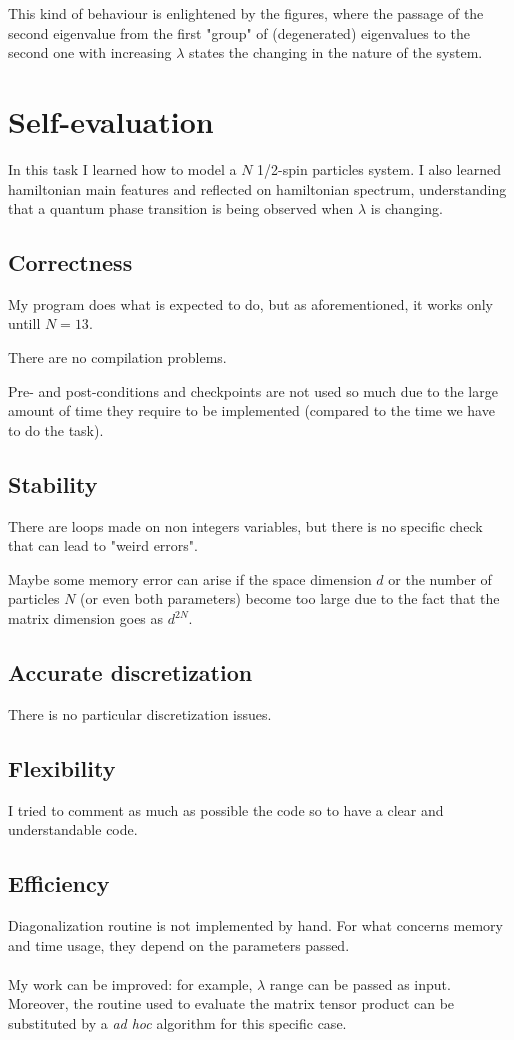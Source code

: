\documentclass[12pt, a4paper, notitlepage]{report}
\begin{document}
This kind of behaviour is enlightened by the figures, where the passage of the second eigenvalue from the first "group" of (degenerated) eigenvalues to the second one with increasing $\lambda$ states the changing in the nature of the system.

\section*{Self-evaluation}
In this task I learned how to model a $N$ 1/2-spin particles system. I also learned hamiltonian main features and reflected on hamiltonian spectrum, understanding that a quantum phase transition is being observed when $\lambda$ is changing.

\subsection*{Correctness}

My program does what is expected to do, but as aforementioned, it works only untill $N=13$.

There are no compilation problems.

Pre- and post-conditions and checkpoints are not used so much due to the large amount of time they require to be implemented (compared to the time we have to do the task).

\subsection*{Stability}

There are loops made on non integers variables, but there is no specific check that can lead to "weird errors".

Maybe some memory error can arise if the space dimension $d$ or the number of particles $N$ (or even both parameters) become too large due to the fact that the matrix dimension goes as $d^{2N}$.

\subsection*{Accurate discretization}

There is no particular discretization issues.

\subsection*{Flexibility}

I tried to comment as much as possible the code so to have a clear and understandable code.

\subsection*{Efficiency}

Diagonalization routine is not implemented by hand. For what concerns memory and time usage, they depend on the parameters passed.\\ \\

My work can be improved: for example, $\lambda$ range can be passed as input. Moreover, the routine used to evaluate the matrix tensor product can be substituted by a \textit{ad hoc} algorithm for this specific case.
\end{document}
